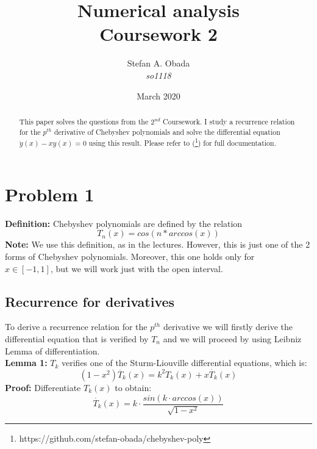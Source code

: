 \documentclass[12pt, a4paper]{article}
\title{Numerical analysis\\
	\large Coursework 2}
\author{Stefan A. Obada \\ \textit{so1118}}
\date{March 2020}
\begin{document}
\maketitle

\begin{abstract}
This paper solves the questions from the $2^{nd}$ Coursework. I study a recurrence relation for the $p^{th}$ derivative of Chebyshev polynomials and solve the differential equation $\ddot{y}(x)-xy(x)=0$ using this result.
Please refer to (\footnote{https://github.com/stefan-obada/chebyshev-poly}) for full documentation.

\tableofcontents
\end{abstract}

\newpage

\section{Problem 1}
\textbf{Definition:} Chebyshev polynomials are defined by the relation 
\begin{equation}
T_{n}(x) = cos(n*arccos(x))
\label{equation:def}
\end{equation}
\textbf{Note:} We use this definition, as in the lectures. However, this is just one of the 2 forms of Chebyshev polynomials. Moreover, this one holds only for \\ $x \in [-1,1]$, but we will work just with the open interval.

\subsection{Recurrence for derivatives}
To derive a recurrence relation for the $p^{th}$ derivative we will firstly derive the differential equation that is verified by $T_{n}$ and we will proceed by using Leibniz Lemma of differentiation.\vspace{4.0mm} \\
\textbf{Lemma 1:} $T_{k}$ verifies one of the Sturm-Liouville differential equations, which is:
\begin{equation}
	(1-x^2)\ddot{T_{k}}(x) = k^2T_{k}(x) + x\dot{T_{k}}(x)
\label{equation:diff}
\end{equation}
\textbf{Proof:} Differentiate $T_{k}(x)$ to obtain:
\begin{equation}
	\dot{T_{k}}(x) = k\cdot\frac{sin(k \cdot arccos(x))}{\sqrt{1-x^2}}
\label{equation:T_dot}
\end{equation}
\end{document}

